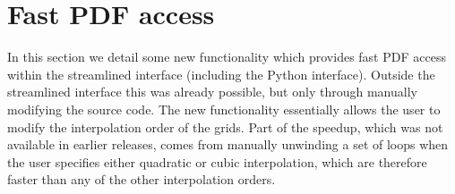 \section{Fast PDF access}
\label{sec:fastpdf}

In this section we detail some new functionality which provides fast
PDF access within the streamlined interface (including the Python
interface). Outside the streamlined interface this was already
possible, but only through manually modifying the source code. The new
functionality essentially allows the user to modify the interpolation
order of the \hoppet{} grids. Part of the speedup, which was not
available in earlier releases, comes from manually unwinding a set of
loops when the user specifies either quadratic or cubic interpolation,
which are therefore faster than any of the other interpolation orders.

